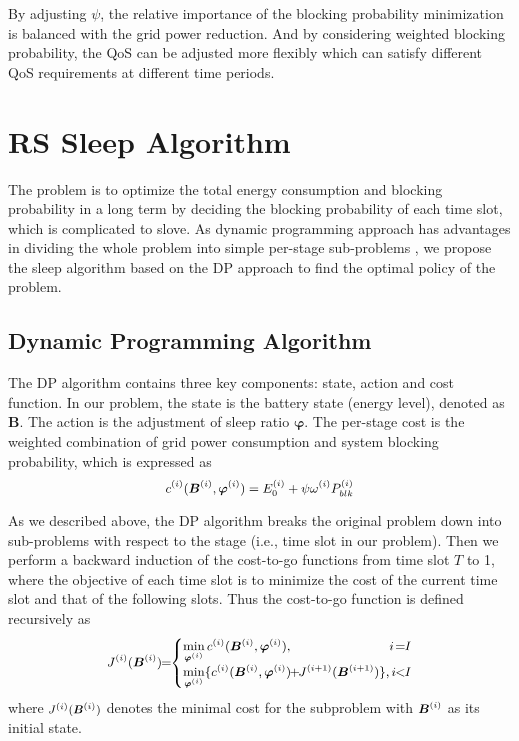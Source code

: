 \documentclass[conference]{IEEEtran}
\begin{document}
  By adjusting $\psi$, the relative importance of the blocking probability minimization is balanced with the grid power reduction. And by considering weighted blocking probability, the QoS can be adjusted more flexibly which can satisfy different QoS requirements at different time periods.

 \section{RS Sleep Algorithm}\label{sec:algorithm}
 The problem is to optimize the total energy consumption and blocking probability in a long term by deciding the blocking probability of each time slot, which is complicated to slove. As dynamic programming approach has advantages in dividing the whole problem into simple per-stage sub-problems \cite{Dimitri2005Dynamic}, we propose the sleep algorithm based on the DP approach to find the optimal policy of the problem.

 \subsection{Dynamic Programming Algorithm}
 The DP algorithm contains three key components: state, action and cost function. In our problem, the state is the battery state (energy level), denoted as $\boldsymbol{B}$. The action is the adjustment of sleep ratio $\boldsymbol{\varphi}$. The per-stage cost is the weighted combination of grid power consumption and system blocking probability, which is expressed as
 \begin{equation}\label{equ:cost function of DP}
  \small{c^{(i)}(\boldsymbol{B}^{(i)},\boldsymbol{\varphi}^{(i)}) = E_0^{(i)}+\psi\omega^{(i)}P_{blk}^{(i)}}
 \end{equation}

 As we described above, the DP algorithm breaks the original problem down into sub-problems with respect to the stage (i.e., time slot in our problem). Then we perform a backward induction of the cost-to-go functions from time slot $T$ to 1, where the objective of each time slot is to minimize the cost of the current time slot and that of the following slots. Thus the cost-to-go function is defined recursively as
 \begin{equation}\label{equ:cost-to-go function of DP}
 \small{J^{(i)}(\boldsymbol{B}^{(i)})\!\!=\!\!\begin{cases}\min\limits_{\boldsymbol{\varphi}^{(i)}}c^{(i)}(\boldsymbol{B}^{(i)},\boldsymbol{\varphi}^{(i)}),\!&\!\!{\!\!i\!=\!\!I}\\ \min\limits_{\boldsymbol{\varphi}^{(i)}}\{c^{(i)}(\boldsymbol{B}^{(i)},\boldsymbol{\varphi}^{(i)})\!\!+\!\!J^{(i+1)}(\boldsymbol{B}^{(i+1)})\},\!\!&\!\!{\!i\!\!<\!\!I}
   \end{cases}}
 \end{equation}
 where $\footnotesize{J^{(i)}(\boldsymbol{B}^{(i)})}$ denotes the minimal cost for the subproblem with $\small{\boldsymbol{B}^{(i)}}$ as its initial state.
\end{document}
